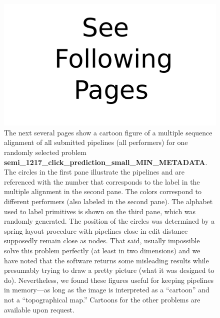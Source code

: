 \documentclass{article}
\begin{document}
\begin{figure}
\centering
\includegraphics{seebelow.pdf}
\caption{The next several pages show a cartoon figure of a multiple
  sequence alignment of all submitted pipelines (all performers) for
  one randomly selected problem {\bf
    semi\_1217\_click\_prediction\_small\_MIN\_METADATA}.  The circles
  in the first pane illustrate the pipelines and are referenced with
  the number that corresponds to the label in the multiple alignment
  in the second pane.  The colors correspond to different performers
  (also labeled in the second pane). The alphabet used to label
  primitives is shown on the third pane, which was randomly generated.
  The position of the circles was determined by a spring layout
  procedure with pipelines close in edit distance supposedly remain
  close as nodes.  That said, usually impossible solve this problem
  perfectly (at least in two dimensions) and we have noted that the
  software returns some misleading results while presumably trying to
  draw a pretty picture (what it was designed to do).  Nevertheless,
  we found these figures useful for keeping pipelines in memory---as
  long as the image is interpreted as a ``cartoon'' and not a
  ``topographical map.''  Cartoons for the other problems are
  available upon request.}
\label{fig:seebelow}
\end{figure}
\end{document}
